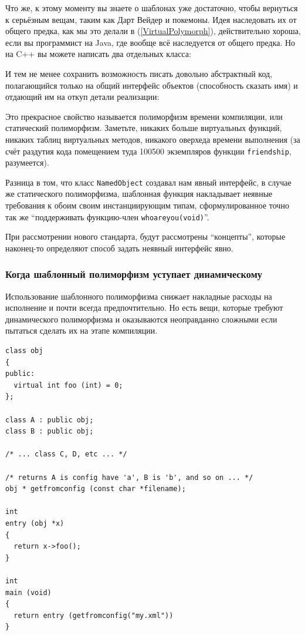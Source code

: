 \documentclass[a4paper,12pt,oneside]{article}
\begin{document}
Что же, к этому моменту вы знаете о шаблонах уже достаточно, чтобы вернуться к серьёзным вещам, таким как Дарт Вейдер и покемоны. Идея наследовать их от общего предка, как мы это делали в (\ref{VirtualPolymorph}), действительно хороша, если вы программист на Java, где вообще всё наследуется от общего предка. Но на C++ вы можете написать два отдельных класса:



И тем не менее сохранить возможность писать довольно абстрактный код, полагающийся только на общий интерфейс объектов (способность сказать имя) и отдающий им на откуп детали реализации:



Это прекрасное свойство называется полиморфизм времени компиляции, или статический полиморфизм. Заметьте, никаких больше виртуальных функций, никаких таблиц виртуальных методов, никакого оверхеда времени выполнения (за счёт раздутия кода помещением туда 100500 экземпляров функции \lstinline!friendship!, разумеется).

Разница в том, что класс \lstinline!NamedObject! создавал нам явный интерфейс, в случае же статического полиморфизма, шаблонная функция накладывает неявные требования к обоим своим инстанциирующим типам, сформулированное точно так же ``поддерживать функцию-член \lstinline!whoareyou(void)!''. 

При рассмотрении нового стандарта, будут рассмотрены ``концепты'', которые наконец-то определяют способ задать неявный интерфейс явно.

\subsubsection{Когда шаблонный полиморфизм уступает динамическому}

Использование шаблонного полиморфизма снижает накладные расходы на исполнение и почти всегда предпочтительно. Но есть вещи, которые требуют динамического полиморфизма и оказываются неоправданно сложными если пытаться сделать их на этапе компиляции.

\begin{lstlisting}
class obj
{
public:
  virtual int foo (int) = 0;    
};

class A : public obj;
class B : public obj;

/* ... class C, D, etc ... */

/* returns A is config have 'a', B is 'b', and so on ... */
obj * getfromconfig (const char *filename);

int
entry (obj *x)
{
  return x->foo();
}

int
main (void)
{
  return entry (getfromconfig("my.xml"))
}
\end{lstlisting}
\end{document}
